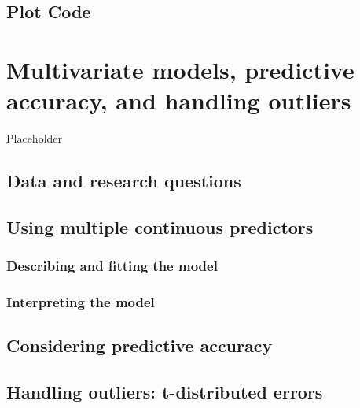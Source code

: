 \documentclass[
]{book}
\begin{document}
\hypertarget{plot-code-7}{%
\section{Plot Code}\label{plot-code-7}}

\hypertarget{multivariate-models-predictive-accuracy-and-handling-outliers}{%
\chapter{Multivariate models, predictive accuracy, and handling outliers}\label{multivariate-models-predictive-accuracy-and-handling-outliers}}

Placeholder

\hypertarget{data-and-research-questions-8}{%
\section{Data and research questions}\label{data-and-research-questions-8}}

\hypertarget{using-multiple-continuous-predictors}{%
\section{Using multiple continuous predictors}\label{using-multiple-continuous-predictors}}

\hypertarget{describing-and-fitting-the-model}{%
\subsection{Describing and fitting the model}\label{describing-and-fitting-the-model}}

\hypertarget{interpreting-the-model-8}{%
\subsection{Interpreting the model}\label{interpreting-the-model-8}}

\hypertarget{considering-predictive-accuracy}{%
\section{Considering predictive accuracy}\label{considering-predictive-accuracy}}

\hypertarget{handling-outliers-t-distributed-errors}{%
\section{Handling outliers: t-distributed errors}\label{handling-outliers-t-distributed-errors}}
\end{document}
